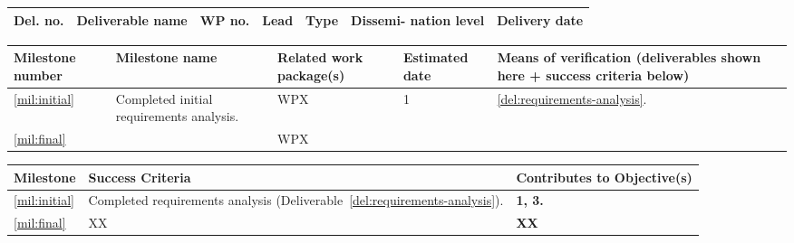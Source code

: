 \documentclass[a4paper,11pt]{article}
\begin{document}
\label{sect:deliverables}

\bigskip\bigskip\bigskip

\begin{minipage}{\textwidth}
\begin{center}
\begin{tabular}{|p{0.8cm}|p{8.75cm}|p{0.8cm}|p{1.2cm}|p{1.2cm}|p{1.2cm}|p{1.2cm}|}  \hline
\textbf{Del. no.}              & \textbf{Deliverable name}        & \textbf{WP no.} & \textbf{Lead}
& \textbf{Type}              & \textbf{Dissemi- nation level}   & \textbf{Delivery date}
\\ \hline


\hline
\end{tabular}
\end{center}
\end{minipage}


\newpage



\label{sect:milestones}

\bigskip\bigskip\bigskip

\begin{minipage}{\textwidth}
\begin{center}
\begin{tabular*}{\textwidth}{|p{1.5cm}|p{6.7cm}|p{2.5cm}|p{1.5cm}|p{3.6cm}|}  \hline
\textbf{Milestone number} & \textbf{Milestone name} & \textbf{Related work
  package(s)} & \textbf{Estimated date} & \textbf{Means of
  verification} (deliverables shown here + success criteria below) \\
\hline
\ref{mil:initial} &
  Completed initial requirements analysis.  &
  WPX &
  1 &
\ref{del:requirements-analysis}.
\\
\ref{mil:final} &
&
WPX &
&
\\
\hline
\end{tabular*}
\end{center}
\end{minipage}

\vspace{10pt}
\begin{center}
\begin{tabular*}{\textwidth}{|p{1.5cm}|p{13.3cm}|p{1.9cm}|}\hline
\textbf{Milestone} & \textbf{Success Criteria} & \textbf{Contributes to
  Objective(s)} \\\hline
\ref{mil:initial} &
Completed requirements analysis (Deliverable~\ref{del:requirements-analysis}). &
 \textbf{1, 3.}
\\
\ref{mil:final} &
XX
& \textbf{XX}
\\\hline
\end{tabular*}
\end{center}
\end{document}
